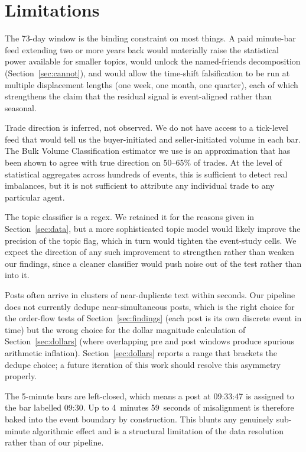 \documentclass[11pt,a4paper]{article}
\begin{document}
\section{Limitations}\label{sec:limits}

The 73-day window is the binding constraint on most things. A paid minute-bar feed extending two or more years back would materially raise the statistical power available for smaller topics, would unlock the named-friends decomposition (Section~\ref{sec:cannot}), and would allow the time-shift falsification to be run at multiple displacement lengths (one week, one month, one quarter), each of which strengthens the claim that the residual signal is event-aligned rather than seasonal.

Trade direction is inferred, not observed. We do not have access to a tick-level feed that would tell us the buyer-initiated and seller-initiated volume in each bar. The Bulk Volume Classification estimator we use is an approximation that has been shown to agree with true direction on 50--65\% of trades. At the level of statistical aggregates across hundreds of events, this is sufficient to detect real imbalances, but it is not sufficient to attribute any individual trade to any particular agent.

The topic classifier is a regex. We retained it for the reasons given in Section~\ref{sec:data}, but a more sophisticated topic model would likely improve the precision of the topic flag, which in turn would tighten the event-study cells. We expect the direction of any such improvement to strengthen rather than weaken our findings, since a cleaner classifier would push noise out of the test rather than into it.

Posts often arrive in clusters of near-duplicate text within seconds. Our pipeline does not currently dedupe near-simultaneous posts, which is the right choice for the order-flow tests of Section~\ref{sec:findings} (each post is its own discrete event in time) but the wrong choice for the dollar magnitude calculation of Section~\ref{sec:dollars} (where overlapping pre and post windows produce spurious arithmetic inflation). Section~\ref{sec:dollars} reports a range that brackets the dedupe choice; a future iteration of this work should resolve this asymmetry properly.

The 5-minute bars are left-closed, which means a post at 09:33:47 is assigned to the bar labelled 09:30. Up to 4~minutes 59~seconds of misalignment is therefore baked into the event boundary by construction. This blunts any genuinely sub-minute algorithmic effect and is a structural limitation of the data resolution rather than of our pipeline.
\end{document}
